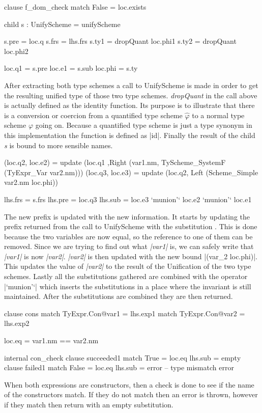 \begin{code}
clause f_dom_check
  match False = loc.exists
  
  child s : UnifyScheme = unifyScheme
  
  s.pre    = loc.q
  s.frs    = lhs.frs
  s.ty1    = dropQuant loc.phi1
  s.ty2    = dropQuant loc.phi2
           
  loc.q1   = s.pre
  loc.e1   = s.sub
  loc.phi  = s.ty
\end{code}
After extracting both type schemes a call to UnifyScheme is made in order to get the resulting unified type of those two type schemes. \emph{dropQuant} in the call above is actually defined as the identity function. Its purpose is to illustrate that there is a conversion or coercion from a quantified type scheme $\hat{\varphi}$ to a normal type scheme $\varphi$ going on. Because a quantified type scheme is just a type synonym in this implementation the function is defined as |id|. Finally the result of the child \emph{s} is bound to more sensible names.

\begin{code}                            
(loc.q2, loc.e2)
  = update (loc.q1
           ,Right (var1.nm, TyScheme_SystemF (TyExpr_Var var2.nm)))
(loc.q3, loc.e3) 
  = update (loc.q2, Left (Scheme_Simple var2.nm loc.phi)) 

lhs.frs = s.frs
lhs.pre = loc.q3
lhs.sub = loc.e3 `munion'` loc.e2 `munion'` loc.e1
\end{code}
The new prefix is updated with the new information. It starts by updating the prefix returned from the call to UnifyScheme with the substitution . This is done because the two variables are now equal, so the reference to one of them can be removed. Since we are trying to find out what \emph{|var1|} is, we can safely write that \emph{|var1|} is now \emph{|var2|}. \emph{|var2|} is then updated with the new bound |(var_2 \geq loc.phi)|. This updates the value of \emph{|var2|} to the result of the Unification of the two type schemes. Lastly all the substitutions gathered are combined with the operator |`munion'`| which inserts the substitutions in a place where the invariant is still maintained. After the substitutions are combined they are then returned.

\begin{code}
clause cons
  match TyExpr.Con@var1 = lhs.exp1
  match TyExpr.Con@var2 = lhs.exp2
  
  loc.eq = var1.nm == var2.nm
  
  internal con_check
     clause succeeded1
       match True  = loc.eq
       lhs.sub     = empty
     clause failed1
       match False = loc.eq
       lhs.sub = error -- type mismatch error
\end{code}
When both expressions are constructors, then a check is done to see if the name of the constructors match. If they do not match then an error is thrown, however if they match then return with an empty substitution.

